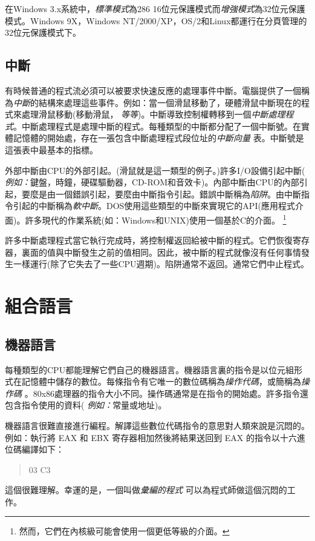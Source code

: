 
在Windows 3.x系統中，\emph{標準模式}為286
16位元保護模式而\emph{增強模式}為32位元保護模式。Windows 9X，Windows
NT/2000/XP，OS/2和Linux都運行在分頁管理的32位元保護模式下。

\subsection{中斷}

有時候普通的程式流必須可以被要求快速反應的處理事件中斷。電腦提供了一個稱為\emph{中斷}的結構來處理這些事件。例如：當一個滑鼠移動了，硬體滑鼠中斷現在的程式來處理滑鼠移動(移動滑鼠，
{\em
等等\/})。中斷導致控制權轉移到一個\emph{中斷處理程式}。中斷處理程式是處理中斷的程式。每種類型的中斷都分配了一個中斷號。在實體記憶體的開始處，存在一張包含中斷處理程式段位址的\emph{中斷向量}
表。中斷號是這張表中最基本的指標。

外部中斷由CPU的外部引起。(滑鼠就是這一類型的例子。)許多I/O設備引起中斷({\em
例如：\/}鍵盤，時鐘，硬碟驅動器，CD-ROM和音效卡)。內部中斷由CPU的內部引起，要麼是由一個錯誤引起，要麼由中斷指令引起。錯誤中斷稱為\emph{陷阱}。由中斷指令引起的中斷稱為\emph{軟中斷}。DOS使用這些類型的中斷來實現它的API(應用程式介面)。許多現代的作業系統(如：Windows和UNIX)使用一個基於C的介面。
\footnote{然而，它們在內核級可能會使用一個更低等級的介面。}

許多中斷處理程式當它執行完成時，將控制權返回給被中斷的程式。它們恢復寄存器，裏面的值與中斷發生之前的值相同。因此，被中斷的程式就像沒有任何事情發生一樣運行(除了它失去了一些CPU週期)。陷阱通常不返回。通常它們中止程式。

\section{組合語言}

\subsection{機器語言}

每種類型的CPU都能理解它們自己的機器語言。機器語言裏的指令是以位元組形式在記憶體中儲存的數位。每條指令有它唯一的數位碼稱為\emph{操作代碼}，或簡稱為\emph{操作碼}
。80x86處理器的指令大小不同。操作碼通常是在指令的開始處。許多指令還包含指令使用的資料({\em
例如：\/}常量或地址)。

機器語言很難直接進行編程。解譯這些數位代碼指令的意思對人類來說是沉悶的。例如：執行將
EAX 和 EBX 寄存器相加然後將結果送回到 EAX
的指令以十六進位碼編譯如下：
\begin{quote}
   03 C3
\end{quote}
這個很難理解。幸運的是，一個叫做\emph{彙編的程式}
可以為程式師做這個沉悶的工作。

